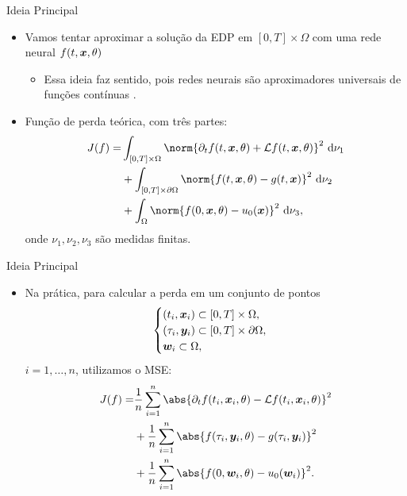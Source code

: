 \documentclass[13pt]{beamer}
\begin{document}
\begin{frame}{Ideia Principal}
    \begin{itemize}
        \item<1-> Vamos tentar aproximar a solução da EDP em \( [0, T] \times \Omega \) com uma rede neural \( f ( t, \bm{x}, \theta ) \)
            \begin{itemize}
                \item<2-> Essa ideia faz sentido, pois redes neurais são aproximadores universais de funções contínuas \cite{hornik91}.
            \end{itemize}
        \item<3-> Função de perda teórica, com três partes:
            \begin{align*}
                J ( f ) = &\int_{ [0, T] \times \Omega } \norm{ \partial_{ t } f ( t, \bfx, \theta ) + \mathcal{L} f ( t, \bfx, \theta ) }^2 \ \mathrm{d}\nu_{ 1 } \\
                &+ \int_{ [0, T] \times \partial \Omega } \norm{ f ( t, \bfx, \theta ) - g ( t, \bfx ) }^2 \ \mathrm{d}\nu_{ 2 } \\
                &+ \int_{ \Omega } \norm{ f ( 0, \bfx, \theta ) - u_{ 0 } ( \bfx ) }^2 \ \mathrm{d}\nu_{ 3 }
            ,\end{align*}
            onde \( \nu_{ 1 }, \nu_{ 2 }, \nu_{ 3 } \) são medidas finitas.
    \end{itemize}
\end{frame}

\begin{frame}{Ideia Principal}
    \begin{itemize}
        \item<1-> Na prática, para calcular a perda em um conjunto de pontos
            \begin{equation*}
                \begin{cases}
                    ( t_{ i }, \bm{x}_{ i } ) \subset [0, T] \times \Omega, \\
                    ( \tau_{ i }, \bm{y}_{ i } ) \subset [0, T] \times \partial \Omega, \\
                    \bm{w}_{ i } \subset \Omega,
                \end{cases}
            \end{equation*}
            \( i = 1, \dots, n \), utilizamos o MSE:
            \begin{align*}
                J ( f ) = &\frac{ 1 }{ n } \sum_{ i=1 }^{ n } \abs{ \partial_{ t } f ( t_{ i }, \bfx_{ i }, \theta ) - \mathcal{L} f ( t_{ i }, \bfx_{ i }, \theta ) }^2 \\
                    &+ \frac{ 1 }{ n } \sum_{ i=1 }^{ n } \abs{ f ( \tau_{ i }, \bfy_{ i }, \theta ) - g ( \tau_{ i }, \bfy_{ i } ) }^2 \\
                    &+ \frac{ 1 }{ n } \sum_{ i=1 }^{ n } \abs{ f ( 0, \bfw_{ i }, \theta ) - u_{ 0 } ( \bfw_{ i } ) }^2
            .\end{align*}
    \end{itemize}
\end{frame}
\end{document}
